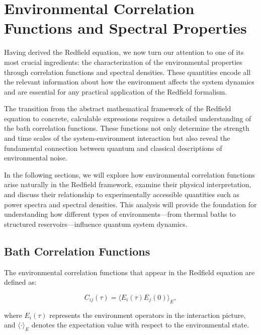 
\section{Environmental Correlation Functions and Spectral Properties}
\label{sec:environmental_correlation_functions}

Having derived the Redfield equation, we now turn our attention to one of its most crucial ingredients: the characterization of the environmental properties through correlation functions and spectral densities. These quantities encode all the relevant information about how the environment affects the system dynamics and are essential for any practical application of the Redfield formalism.

The transition from the abstract mathematical framework of the Redfield equation to concrete, calculable expressions requires a detailed understanding of the bath correlation functions. These functions not only determine the strength and time scales of the system-environment interaction but also reveal the fundamental connection between quantum and classical descriptions of environmental noise.

In the following sections, we will explore how environmental correlation functions arise naturally in the Redfield framework, examine their physical interpretation, and discuss their relationship to experimentally accessible quantities such as power spectra and spectral densities. This analysis will provide the foundation for understanding how different types of environments—from thermal baths to structured reservoirs—influence quantum system dynamics.

\subsection{Bath Correlation Functions}

The environmental correlation functions that appear in the Redfield equation are defined as:

\begin{equation}
	C_{ij}(\tau) = \langle E_i(\tau) E_j(0) \rangle_E,
	\label{eq:bath_correlator_general}
\end{equation}

where $E_i(\tau)$ represents the environment operators in the interaction picture, and $\langle \cdot \rangle_E$ denotes the expectation value with respect to the environmental state.

